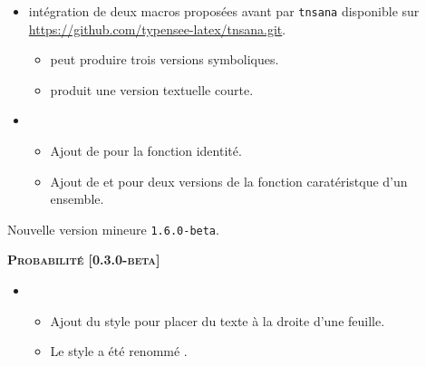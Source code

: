 \documentclass[12pt,a4paper]{book}
\begin{document}
\begin{description}
\begin{itemize}[itemsep=.5em]
    \item {}
          intégration de deux macros proposées avant par \verb#tnsana# disponible sur \url{https://github.com/typensee-latex/tnsana.git}.

    \begin{itemize}[itemsep=.5em]
        \item {} peut produire trois versions symboliques.

        \item {} produit une version textuelle courte.
    \end{itemize}


    \item {}

    \begin{itemize}[itemsep=.5em]
        \item Ajout de  pour la fonction identité.

        \item Ajout de  et  pour deux versions de la fonction caratéristque d'un ensemble.
    \end{itemize}
\end{itemize}


\separation

\end{description}\begin{description}
\medskip
\item[2020-07-25] Nouvelle version mineure \verb+1.6.0-beta+.




\begin{center}
    \textbf{\textsc{Probabilité [0.3.0-beta]}}
\end{center}

\begin{itemize}[itemsep=.5em]
    \item {}
    \begin{itemize}[itemsep=.5em]
        \item Ajout du style  pour placer du texte à la droite d'une feuille.

        \item Le style  a été renommé .
    \end{itemize}


\end{itemize}
\end{description}
\end{document}
